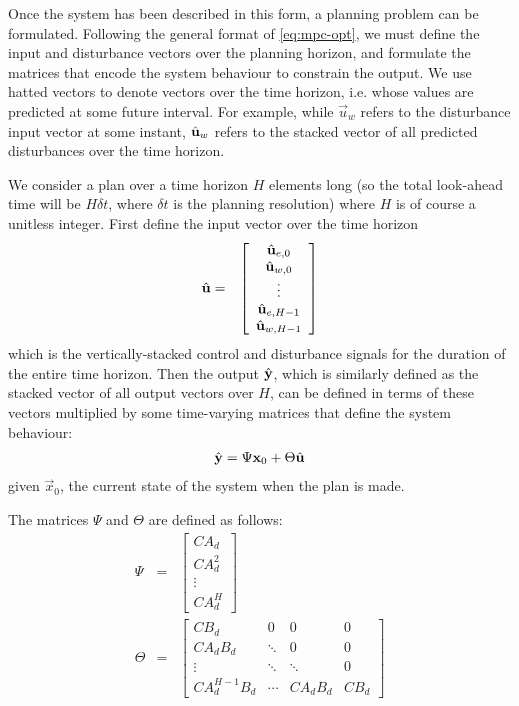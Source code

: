 Once the system has been described in this form, a planning problem can be formulated.
Following the general format of \autoref{eq:mpc-opt}, we must define the input and disturbance vectors over the planning horizon, and formulate the matrices that encode the system behaviour to constrain the output.
We use hatted vectors to denote vectors over the time horizon, i.e. whose values are predicted at some future interval.
For example, while $\vec{u}_w$ refers to the disturbance input vector at some instant, $\hat{\mathbf{u}}_w$ refers to the stacked vector of all predicted disturbances over the time horizon.

We consider a plan over a time horizon $H$ elements long (so the total look-ahead time will be $H \delta t$, where $\delta t$ is the planning resolution) where $H$ is of course a unitless integer.
First define the input vector over the time horizon
\begin{eqnarray*}
   \hat{\mathbf{u}} &=& \left[\begin{array}{c}
      \hat{\mathbf{u}}_{e, 0} \\ \hat{\mathbf{u}}_{w, 0} \\
      \vdots \\
      \hat{\mathbf{u}}_{e, H-1} \\ \hat{\mathbf{u}}_{w, H-1}
   \end{array}\right]
\end{eqnarray*}
which is the vertically-stacked control and disturbance signals for the duration of the entire time horizon.
Then the output $\hat{\mathbf{y}}$, which is similarly defined as the stacked vector of all output vectors over $H$, can be defined in terms of these vectors multiplied by some time-varying matrices that define the system behaviour:
\begin{eqnarray}
   \label{eq:mpc-vectors}
   \hat{\mathbf{y}} = \Psi \mathbf{x}_0 + \Theta \hat{\mathbf{u}}
\end{eqnarray}
given $\vec{x}_0$, the current state of the system when the plan is made.

The matrices $\Psi$ and $\Theta$ are defined as follows:
\begin{eqnarray}
   \label{eq:mpc-psi}
   \Psi &=& \left[\begin{array}{c}
      CA_d \\ CA_d^2 \\ \vdots \\ CA_d^H
   \end{array}\right]
   \\
   \label{eq:mpc-theta}
   \Theta &=& \left[\begin{array}{cccc}
      C B_d & 0 & 0 & 0 \\
      C A_d B_d & \ddots & 0 & 0 \\
      \vdots & \ddots & \ddots & 0 \\
      C A_d ^{H-1} B_d & \cdots & C A_d B_d & C B_d
   \end{array}\right]
\end{eqnarray}

